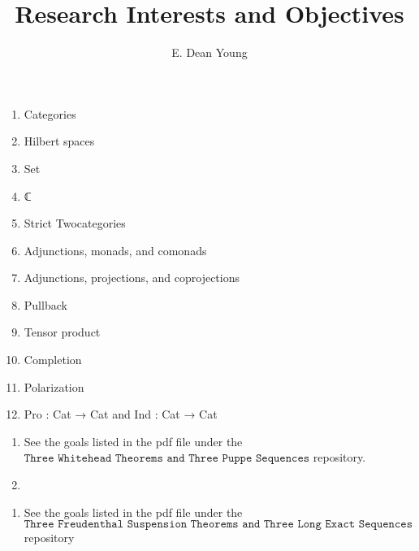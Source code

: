 \documentclass{book}
\title{Research Interests and Objectives}
\author{E. Dean Young}
\begin{document}
\maketitle


\begin{center}
\scalebox{1.3}{\bf Stage 0: (Category Theory)}
\end{center}

\begin{enumerate}
\item Categories
\item Hilbert spaces
\item Set
\item ℂ
\item Strict Twocategories
\item Adjunctions, monads, and comonads
\item Adjunctions, projections, and coprojections
\item Pullback
\item Tensor product
\item Completion
\item Polarization
\item Pro : Cat → Cat and Ind : Cat → Cat
\end{enumerate}

\newpage
\begin{center}
\end{center}


\begin{enumerate}
\item See the goals listed in the pdf file under the $\texttt{Three Whitehead Theorems and Three Puppe Sequences}$ repository.
\item 
\end{enumerate}

\newpage
\begin{center}
\end{center}

\begin{enumerate}
\item See the goals listed in the pdf file under the $\texttt{Three Freudenthal Suspension Theorems and Three Long Exact Sequences}$ repository 
\end{enumerate}


\newpage
\begin{center}
\end{center}
\end{document}
